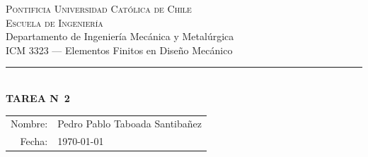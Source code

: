 \documentclass[11pt]{article}
\begin{document}
\begin{center}
    {\scshape\large Pontificia Universidad Cat\'olica de Chile}\\[2pt]
    {\scshape Escuela de Ingenier\'ia}\\[2pt]
    {\small Departamento de Ingenier\'ia Mec\'anica y Metal\'urgica}\\[2pt]
    {\small ICM 3323 --- Elementos Finitos en Dise\~no Mec\'anico}\\[10pt]
    {\color{ucred}\rule{0.42\linewidth}{0.6pt}}\\[10pt]
    {\Huge\bfseries\color{ucred} TAREA N\textdegree\ 2}
\end{center}

\vspace{4pt}
\begin{flushright}
\renewcommand{\arraystretch}{1.4}
\begin{tabular}{rl}
    Nombre: & Pedro Pablo Taboada Santiba\~nez \\
    Fecha:  & \today\\
\end{tabular}
\end{flushright}

\vspace{0.6cm}


\end{document}
